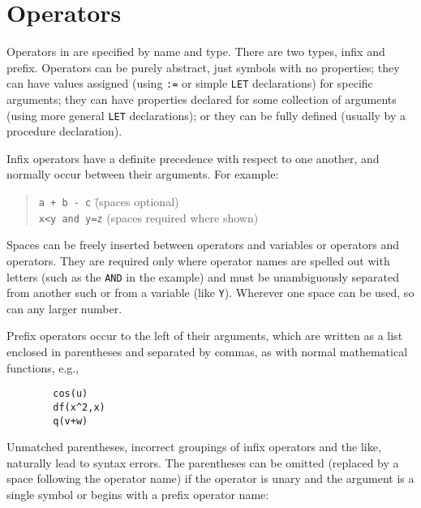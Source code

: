 \section{Operators}
\label{sec-operators}

Operators in {\REDUCE} are specified by name and type.
There are two types, infix and prefix.
  Operators can be purely abstract, just symbols
with no properties; they can have values assigned (using {\tt :=} or
simple {\tt LET} declarations) for specific arguments; they can have
properties declared for some collection of arguments (using more general
{\tt LET} declarations); or they can be fully defined (usually by a
procedure declaration).

Infix operators have a definite precedence with
respect to one another, and normally occur between their arguments.
For example:
\begin{quote}
\begin{tabbing}
{\tt a + b - c} \hspace{1.5in} \= (spaces optional) \\
{\tt x<y and y=z} \> (spaces required where shown)
\end{tabbing}
\end{quote}
Spaces can be freely inserted between operators and variables or operators
and operators. They are required only where operator names are spelled out
with letters (such as the {\tt AND} in the example) and must be unambiguously
separated from another such or from a variable (like {\tt Y}). Wherever one
space can be used, so can any larger number.

Prefix operators occur to the left of their arguments, which are written as
a list enclosed in parentheses and separated by commas, as with normal
mathematical functions, e.g.,
\begin{verbatim}
        cos(u)
        df(x^2,x)
        q(v+w)
\end{verbatim}
Unmatched parentheses, incorrect groupings of infix operators
 and the like, naturally lead to syntax errors.  The
parentheses can be omitted (replaced by a space following the
operator name) if the operator is unary and the argument
is a single symbol or begins with a prefix operator name:

